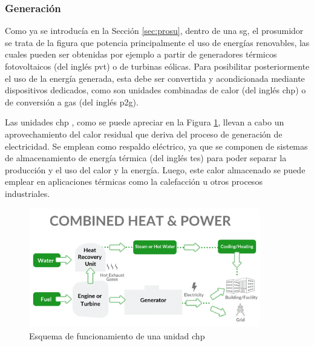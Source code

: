 \subsubsection{Generación}

Como ya se introducía en la Sección \ref{sec:prosu}, dentro de una \gls{sg}, el prosumidor se trata de la figura que potencia principalmente el uso de energías renovables, las cuales pueden ser obtenidas por ejemplo a partir de generadores térmicos fotovoltaicos (del inglés \gls{pvt}) o de turbinas eólicas. Para posibilitar posteriormente el uso de la energía generada, esta debe ser convertida y acondicionada mediante dispositivos dedicados, como son unidades combinadas de calor (del inglés \gls{chp}) o de conversión a gas (del inglés \gls{p2g}). \cite{transactive}

\vspace{3mm}

Las unidades \gls{chp} \cite{chp}, como se puede apreciar en la Figura \ref{fig:chp}, llevan a cabo un aprovechamiento del calor residual que deriva del proceso de generación de electricidad. Se emplean como respaldo eléctrico, ya que se componen de sistemas de almacenamiento de energía térmica (del inglés \gls{tes}) para poder separar la producción y el uso del calor y la energía. Luego, este calor almacenado se puede emplear en aplicaciones térmicas como la calefacción u otros procesos industriales. \cite{chp2}

\vspace{3mm}

\begin{figure}[H]
  \centering
  \includegraphics[width=0.9\textwidth]{img/teoria/chp.png}
  \caption{Esquema de funcionamiento de una unidad \acrshort{chp} \cite{chp}}
  \label{fig:chp}
\end{figure}

\vspace{3mm}

